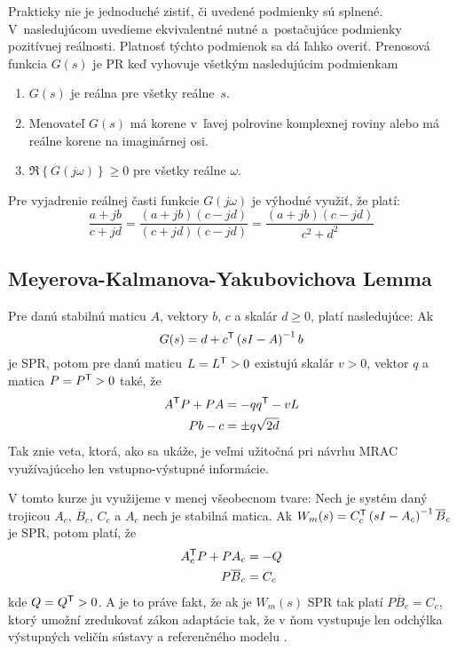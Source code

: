 \documentclass[a4paper, 10pt, ]{article}
\begin{document}
Prakticky nie je jednoduché zistiť, či uvedené podmienky sú splnené. V~nasledujúcom uvedieme ekvivalentné nutné a~postačujúce podmienky pozitívnej reálnosti. Platnosť týchto podmienok sa dá ľahko overiť.
Prenosová funkcia $G(s)$ je PR keď vyhovuje všetkým nasledujúcim podmienkam
\begin{enumerate}
	\item $G(s)$ je reálna pre všetky reálne~$s$.
	\item Menovateľ $G(s)$ má korene  v~ľavej polrovine komplexnej roviny alebo má reálne korene na imaginárnej osi.
	\item $\Re \left\{ G(j\omega) \right\} \geq 0$ pre všetky reálne $\omega$.
\end{enumerate}

\noindent
Pre vyjadrenie reálnej časti funkcie $G(j\omega)$ je výhodné využiť, že platí:
\begin{equation*}
	\frac{a + jb}{c + jd} = \frac{(a + jb) (c - jd)}{(c + jd) (c - jd)} = \frac{(a + jb) (c - jd)}{c^2 + d^2}
\end{equation*}








\subsection{Meyerova-Kalmanova-Yakubovichova Lemma}
\label{Meyer-Kalman-Yakubovichova Lemma}


Pre danú stabilnú maticu $A$, vektory $b$, $c$ a skalár $d \geq 0$, platí nasledujúce: Ak
\begin{equation*}
	G(s) = d + c^{\mathsf{T}} \left( s I - A \right)^{-1} b
\end{equation*}
je SPR, potom pre danú maticu $L = L^{\mathsf{T}} > 0$ existujú skalár $v > 0$, vektor $q$ a matica $P =P^{\mathsf{T}} > 0$ také, že
\begin{align*}
	A^{\mathsf{T}} P + P A &= - q q^{\mathsf{T}} - v L \\
	P b	- c	&= \pm q \sqrt{2d}
\end{align*}
Tak znie veta, ktorá, ako sa ukáže, je veľmi užitočná pri návrhu MRAC využívajúceho len vstupno-výstupné informácie.

V tomto kurze ju využijeme v menej všeobecnom tvare: Nech je systém daný trojicou $A_c$, $\overline{B}_c$, $C_c$ a $A_c$ nech je stabilná matica. Ak $ W_m(s) = C_c^{\mathsf{T}} \left(  s I - A_c \right)^{-1} \overline{B}_c $ je SPR, potom platí, že
\begin{align*}
	  A_c^{\mathsf{T}} P + P A_c &= - Q\\
	  P \overline{B}_c &= C_c
\end{align*}
kde $Q = Q^{\mathsf{T}} > 0$. A je to práve fakt, že ak je $W_m(s)$ SPR tak platí $P \overline{B}_c = C_c$, ktorý umožní zredukovať zákon adaptácie tak, že v ňom vystupuje len odchýlka výstupných veličín sústavy a referenčného modelu \cite{Mon74}.
\end{document}
